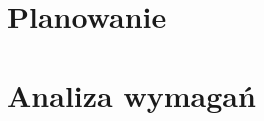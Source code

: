 
\chapter{Planowanie}
\label{ch:planowanie}



\chapter{Analiza wymagań}
\label{ch:analiza_wymagan}








